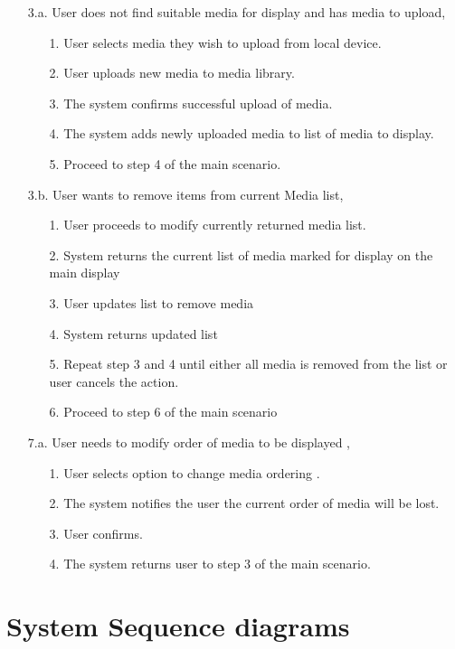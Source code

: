 \documentclass{article}
\begin{document}
    \begin{enumerate}
        \item[3.a.] User does not find suitable media for display and has media to upload,
        \begin{enumerate}
            \item[1.] User selects media they wish to upload from local device.
            \item[2.] User uploads new media to media library.
            \item[3.] The system confirms successful upload of media.
            \item[4.] The system adds newly uploaded media to list of media to display.
            \item[5.] Proceed to step 4 of the main scenario.
        \end{enumerate}
        \item [3.b.] User wants to remove items from current Media list,
        \begin{enumerate}
            \item[1.] User proceeds to modify currently returned media list.
            \item[2.] System returns the current list of media marked for display on the main display
            \item[3.] User updates list to remove media
            \item[4.] System returns updated list
            \item[5.] Repeat step 3 and 4 until either all media is removed from the list or user cancels the action.
            \item[6.] Proceed to step 6 of the main scenario
        \end{enumerate}
        \item[7.a.] User needs to modify order of media to be displayed ,
        \begin{enumerate}
            \item[1.] User selects option to change media ordering .
            \item[2.] The system notifies the user the current order of media will be lost.
            \item[3.] User confirms.
            \item[4.] The system returns user to step 3 of the main scenario.
        \end{enumerate}
    \end{enumerate}
\section{System Sequence diagrams}
\end{document}
